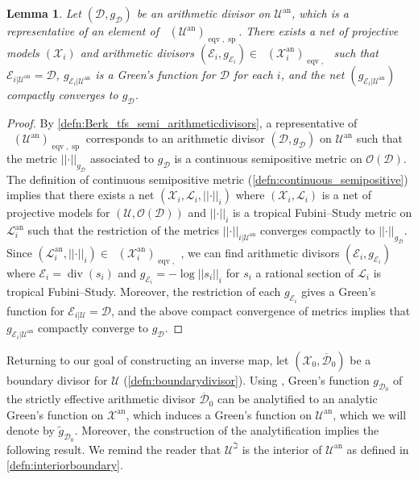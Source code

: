 \documentclass[11pt,reqno]{amsart}
\newcommand{\cX}{\mathcal{X}}
\newcommand{\cE}{\mathcal{E}}
\newcommand{\cD}{\mathcal{D}}
\newcommand{\cO}{\mathcal{O}}
\newcommand{\cU}{\mathcal{U}}
\newcommand{\wt}[1]{\widetilde{#1}}
\newcommand{\cL}{\mathcal{L}}
\newcommand{\nrm}[1]{\left|\left |#1\right |\right |}
\theoremstyle{theorem}
\numberwithin{equation}{subsection}
\newtheorem{lemma}[subsubsection]{Lemma}
\numberwithin{equation}{subsection}
\theoremstyle{definition}
\theoremstyle{remark}
\numberwithin{equation}{subsubsection} \numberwithin{figure}{section}
\DeclareMathOperator{\an}{an}
\DeclareMathOperator{\aPic}{\widehat{Pic}}
\DeclareMathOperator{\ddiv}{div}
\DeclareMathOperator{\aDiv}{\widehat{Div}}
\DeclareMathOperator{\aCaCl}{\widehat{CaCl}}
\DeclareMathOperator{\tFS}{FS^{\tau}}
\DeclareMathOperator{\semip}{sp}
\DeclareMathOperator{\eqv}{eqv}
\begin{document}
\begin{lemma}\label{lemma:Greensfunctionsemipositive}
Let $(\cD,g_{\cD})$ be an arithmetic divisor on $\cU^{\an}$, which is a representative of an element of $\aCaCl(\cU^{\an})_{\eqv,\semip}$. 
There exists a net of projective models $(\cX_i)$ and arithmetic divisors $(\cE_i,g_{\cE_i}) \in \aDiv(\cX_i^{\an})_{\eqv, \tFS}$ such that $\cE_{i|\cU^{\an}} = \cD$, $g_{\cE_i|\cU^{\an}}$ is a Green's function for $\cD$ for each $i$,  and the net $(g_{\cE_i|\cU^{\an}})$ compactly converges to $g_{\cD}$. 
%
\end{lemma}
\begin{proof}
By \autoref{defn:Berk_tfs_semi_arithmeticdivisors}, a representative of $\aCaCl(\cU^{\an})_{\eqv,\semip}$ corresponds to an arithmetic divisor $(\cD,g_{\cD})$ on $\cU^{\an} $ such that the metric $\nrm{\cdot}_{g_{\cD}}$ associated to $g_{\cD}$ is a continuous semipositive metric on $\cO(\cD)$. 
The definition of continuous semipositive metric (\autoref{defn:continuous_semipositive}) implies that there exists a net $(\cX_i,\cL_i,\nrm{\cdot}_i)$ where $(\cX_i,\cL_i)$ is a net of projective models for $(\cU,\cO(\cD))$ and $\nrm{\cdot}_i$ is a tropical Fubini--Study metric on $\cL_i^{\an}$ such that the restriction of the metrics $\nrm{\cdot}_{i|\cU^{\an}}$ converges compactly to $\nrm{\cdot}_{g_{\cD}}$. 
Since $(\cL_i^{\an},\nrm{\cdot}_i) \in \aPic(\cX_i^{\an})_{\eqv,\tFS}$, we can find arithmetic divisors $(\cE_i,g_{\cE_i})$ where $\cE_i = \ddiv(s_i)$ and $g_{\cE_i} = -\log \nrm{s_i}_{i}$ for $s_i$ a rational section of $\cL_i$ is tropical Fubini--Study.  
Moreover, the restriction of each $g_{\cE_i}$ gives a Green's function for $\cE_{i|\cU} = \cD$, and the above compact convergence of metrics implies that $g_{\cE_i|\cU^{\an}}$ compactly converge to $g_{\cD}$. 
\end{proof}

Returning to our goal of constructing an inverse map, 
let $(\cX_0,\overline{\cD}_0)$ be a boundary divisor for $\cU$ (\autoref{defn:boundarydivisor}). 
Using \cite[Lemma 3.3.2]{YuanZhang:AdelicLineBundles}, Green's function $g_{\cD_0}$ of the strictly effective arithmetic divisor $\overline{\cD}_0$ can be analytified to an analytic Green's function on $\cX^{\an}$, which induces a Green's function on $\cU^{\an}$, which we will denote by $\wt{g}_{\cD_0}$. 
Moreover, the construction of the analytification implies the following result. 
We remind the reader that $\cU^{\beth}$ is the interior of $\cU^{\an}$ as defined in \autoref{defn:interiorboundary}. 
\end{document}
